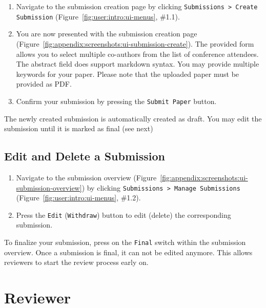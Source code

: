 \documentclass[nochapterpage,nopartpage,noheadingspace,numbersubsubsec,bigchapter,colorback,accentcolor=tud9c,10pt]{tudreport}
\begin{document}
        \begin{enumerate}
            \setlength\itemsep{0em}
            \item Navigate to the submission creation page by clicking \texttt{Submissions > Create Submission} (Figure~\ref{fig:user:intro:ui-menus}, \#1.1).
            \item You are now presented with the submission creation page (Figure~\ref{fig:appendix:screenshots:ui-submission-create}). The provided form allows you to select multiple co-authors from the list of conference attendees. The abstract field does support markdown syntax. You may provide multiple keywords for your paper. Please note that the uploaded paper must be provided as PDF.
            \item Confirm your submission by pressing the \texttt{Submit Paper} button.
        \end{enumerate}

    \noindent
    The newly created submission is automatically created as draft. You may edit the submission until it is marked as final (see next)

  \section{Edit and Delete a Submission}
  \label{ch:user:author:edit-sbumission}

        \begin{enumerate}
            \setlength\itemsep{0em}
            \item Navigate to the submission overview (Figure~\ref{fig:appendix:screenshots:ui-submission-overview}) by clicking \texttt{Submissions > Manage Submissions} (Figure~\ref{fig:user:intro:ui-menus}, \#1.2).
            \item Press the \texttt{Edit} (\texttt{Withdraw}) button to edit (delete) the corresponding submission.
        \end{enumerate}

    \noindent
    To finalize your submission, press on the \texttt{Final} switch within the submission overview. Once a submission is final, it can not be edited anymore. This allows reviewers to start the review process early on.

  \chapter{Reviewer}
  \label{ch:user:reviewer}
\end{document}
